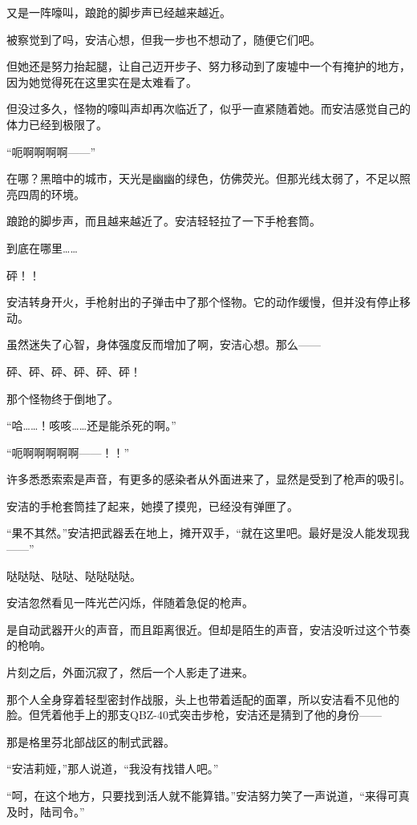 又是一阵嚎叫，踉跄的脚步声已经越来越近。

被察觉到了吗，安洁心想，但我一步也不想动了，随便它们吧。

但她还是努力抬起腿，让自己迈开步子、努力移动到了废墟中一个有掩护的地方，因为她觉得死在这里实在是太难看了。

但没过多久，怪物的嚎叫声却再次临近了，似乎一直紧随着她。而安洁感觉自己的体力已经到极限了。

“呃啊啊啊啊——”

在哪？黑暗中的城市，天光是幽幽的绿色，仿佛荧光。但那光线太弱了，不足以照亮四周的环境。

踉跄的脚步声，而且越来越近了。安洁轻轻拉了一下手枪套筒。

到底在哪里……

砰！！

安洁转身开火，手枪射出的子弹击中了那个怪物。它的动作缓慢，但并没有停止移动。

虽然迷失了心智，身体强度反而增加了啊，安洁心想。那么——

砰、砰、砰、砰、砰、砰！

那个怪物终于倒地了。

“哈……！咳咳……还是能杀死的啊。”

“呃啊啊啊啊啊——！！”

许多悉悉索索是声音，有更多的感染者从外面进来了，显然是受到了枪声的吸引。

安洁的手枪套筒挂了起来，她摸了摸兜，已经没有弹匣了。

“果不其然。”安洁把武器丢在地上，摊开双手，“就在这里吧。最好是没人能发现我——”

哒哒哒、哒哒、哒哒哒哒。

安洁忽然看见一阵光芒闪烁，伴随着急促的枪声。

是自动武器开火的声音，而且距离很近。但却是陌生的声音，安洁没听过这个节奏的枪响。

片刻之后，外面沉寂了，然后一个人影走了进来。

那个人全身穿着轻型密封作战服，头上也带着适配的面罩，所以安洁看不见他的脸。但凭着他手上的那支QBZ-40式突击步枪，安洁还是猜到了他的身份——

那是格里芬北部战区的制式武器。

“安洁莉娅，”那人说道，“我没有找错人吧。”

“呵，在这个地方，只要找到活人就不能算错。”安洁努力笑了一声说道，“来得可真及时，陆司令。”

\section*{}

